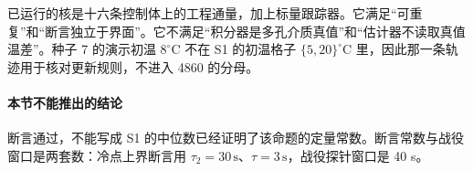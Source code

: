 已运行的核是十六条控制体上的工程通量，加上标量跟踪器。它满足“可重复”和“断言独立于界面”。它不满足“积分器是多孔介质真值”和“估计器不读取真值温差”。种子 7 的演示初温 \(8^\circ\mathrm{C}\) 不在 S1 的初温格子 \(\{5,20\}^\circ\mathrm{C}\) 里，因此那一条轨迹用于核对更新规则，不进入 4860 的分母。

\paragraph{本节不能推出的结论}
断言通过，不能写成 S1 的中位数已经证明了该命题的定量常数。断言常数与战役窗口是两套数：冷点上界断言用 \(\tau_2=30\,\mathrm{s}\)、\(\tau=3\,\mathrm{s}\)，战役探针窗口是 40 s。
